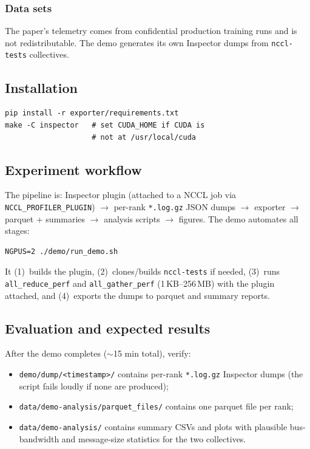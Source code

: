 \documentclass[10pt,twocolumn]{article}
\begin{document}
\subsubsection{Data sets}

The paper's telemetry comes from confidential production training
runs and is not redistributable. The demo generates its own
Inspector dumps from \texttt{nccl-tests} collectives.

\subsection{Installation}

{\small
\begin{verbatim}
pip install -r exporter/requirements.txt
make -C inspector   # set CUDA_HOME if CUDA is
                    # not at /usr/local/cuda
\end{verbatim}
}

\subsection{Experiment workflow}

The pipeline is: Inspector plugin (attached to a NCCL job via
\texttt{NCCL\_PROFILER\_PLUGIN}) $\rightarrow$ per-rank
\texttt{*.log.gz} JSON dumps $\rightarrow$ exporter $\rightarrow$
parquet + summaries $\rightarrow$ analysis scripts $\rightarrow$
figures. The demo automates all stages:

{\small
\begin{verbatim}
NGPUS=2 ./demo/run_demo.sh
\end{verbatim}
}

It (1)~builds the plugin, (2)~clones/builds \texttt{nccl-tests} if
needed, (3)~runs \texttt{all\_reduce\_perf} and
\texttt{all\_gather\_perf} (1\,KB--256\,MB) with the plugin
attached, and (4)~exports the dumps to parquet and summary
reports.

\subsection{Evaluation and expected results}

After the demo completes ($\sim$15 min total), verify:

{\small
\begin{itemize}
  \item \texttt{demo/dump/<timestamp>/} contains per-rank
        \texttt{*.log.gz} Inspector dumps (the script fails loudly
        if none are produced);
  \item \texttt{data/demo-analysis/parquet\_files/} contains one
        parquet file per rank;
  \item \texttt{data/demo-analysis/} contains summary CSVs and
        plots with plausible bus-bandwidth and message-size
        statistics for the two collectives.
\end{itemize}
}
\end{document}
